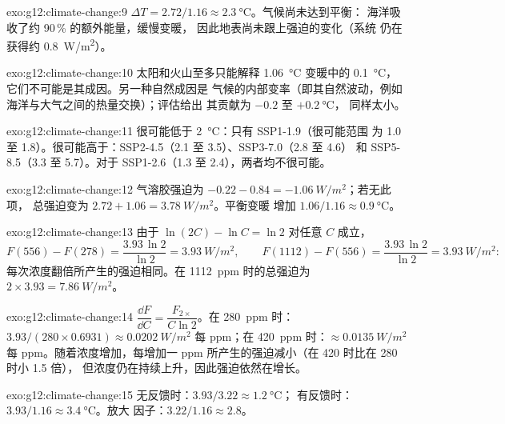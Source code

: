 \begin{solution}{exo:g12:climate-change:9}
$\Delta T = 2.72/1.16 \approx \qty{2.3}{\degreeCelsius}$。气候尚未达到平衡：
海洋吸收了约 90\,\% 的额外能量，缓慢变暖，
因此地表尚未跟上强迫的变化（系统
仍在获得约 \qty{0.8}{W/m^2}）。
\end{solution}

\begin{solution}{exo:g12:climate-change:10}
太阳和火山至多只能解释 \qty{1.06}{\degreeCelsius} 变暖中的 \qty{0.1}{\degreeCelsius}，
它们不可能是其成因。另一种自然成因是
气候的内部变率（即其自然波动，例如
海洋与大气之间的热量交换）；评估给出
其贡献为 $-0.2$ 至 $+\qty{0.2}{\degreeCelsius}$，
同样太小。
\end{solution}

\begin{solution}{exo:g12:climate-change:11}
很可能低于 \qty{2}{\degreeCelsius}：只有 SSP1-1.9（很可能范围
为 1.0 至 1.8）。很可能高于：SSP2-4.5（2.1 至 3.5）、SSP3-7.0（2.8 至 4.6）
和 SSP5-8.5（3.3 至 5.7）。对于 SSP1-2.6（1.3 至 2.4），两者均不很可能。
\end{solution}

\begin{solution}{exo:g12:climate-change:12}
气溶胶强迫为 $-0.22 - 0.84 = \qty{-1.06}{W/m^2}$；若无此项，
总强迫变为 $2.72 + 1.06 = \qty{3.78}{W/m^2}$。平衡变暖
增加 $1.06/1.16 \approx \qty{0.9}{\degreeCelsius}$。
\end{solution}

\begin{solution}{exo:g12:climate-change:13}
由于 $\ln(2C) - \ln C = \ln 2$ 对任意 $C$ 成立，
\[
  F(556) - F(278) = \frac{3.93\,\ln 2}{\ln 2} = \qty{3.93}{W/m^2}, \qquad
  F(1112) - F(556) = \frac{3.93\,\ln 2}{\ln 2} = \qty{3.93}{W/m^2}:
\]
每次浓度翻倍所产生的强迫相同。在 \qty{1112}{ppm} 时的总强迫为 $2 \times 3.93 =
\qty{7.86}{W/m^2}$。
\end{solution}

\begin{solution}{exo:g12:climate-change:14}
$\dfrac{\dd F}{\dd C} = \dfrac{F_{2\times}}{C \ln 2}$。在 \qty{280}{ppm} 时：
$3.93/(280 \times 0.6931) \approx \qty{0.0202}{W/m^2}$ 每 ppm；在
\qty{420}{ppm} 时：$\approx \qty{0.0135}{W/m^2}$ 每 ppm。随着浓度增加，每增加一 ppm
所产生的强迫减小（在 420 时比在 280 时小 1.5 倍），
但浓度仍在持续上升，因此强迫依然在增长。
\end{solution}

\begin{solution}{exo:g12:climate-change:15}
无反馈时：$3.93/3.22 \approx \qty{1.2}{\degreeCelsius}$；
有反馈时：$3.93/1.16 \approx \qty{3.4}{\degreeCelsius}$。放大
因子：$3.22/1.16 \approx 2.8$。
\end{solution}


